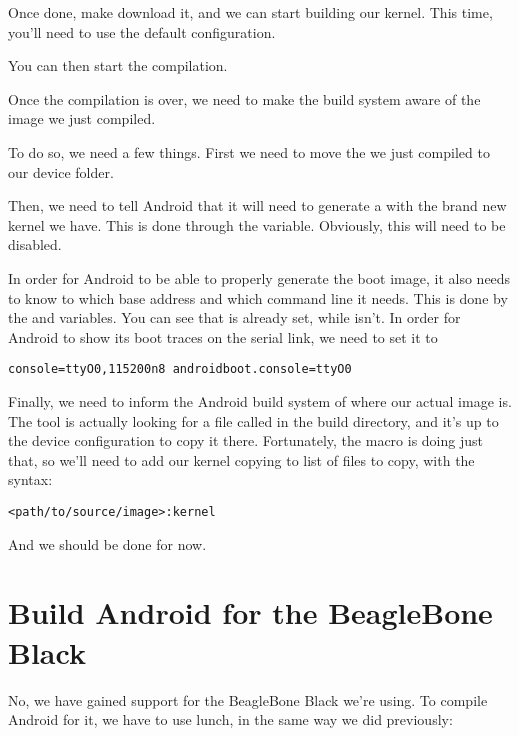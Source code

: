 Once done, make  download it, and we can start building our
kernel. This time, you'll need to use the 
default configuration.

You can then start the compilation.

Once the compilation is over, we need to make the build system aware
of the image we just compiled.

To do so, we need a few things. First we need to move the
 we just compiled to our device folder.

Then, we need to tell Android that it will need to generate a
 with the brand new kernel we have. This is done
through the  variable. Obviously, this will
need to be disabled.

In order for Android to be able to properly generate the boot image,
it also needs to know to which base address and which command line it
needs. This is done by the  and
 variables. You can see that
 is already set, while
 isn't. In order for Android to show its
boot traces on the serial link, we need to set it to

\begin{verbatim}
console=ttyO0,115200n8 androidboot.console=ttyO0
\end{verbatim}

Finally, we need to inform the Android build system of where our
actual image is. The  tool is actually looking for a
file called  in the build directory, and it's up to the
device configuration to copy it there. Fortunately, the
 macro is doing just that, so we'll need to
add our kernel copying to list of files to copy, with the syntax:

\begin{verbatim}
<path/to/source/image>:kernel
\end{verbatim}

And we should be done for now.

\section{Build Android for the BeagleBone Black}

No, we have gained support for the BeagleBone Black we're using. To
compile Android for it, we have to use lunch, in the same way we did
previously:

